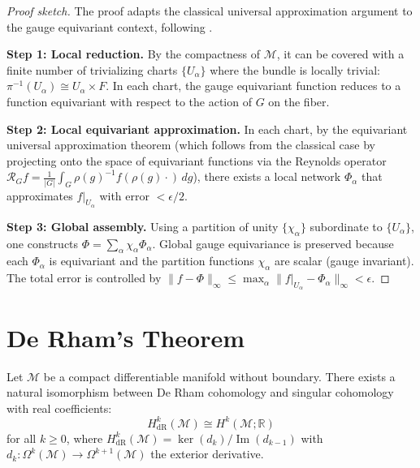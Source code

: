 \begin{proof}[Proof sketch]
The proof adapts the classical universal approximation argument to the gauge equivariant context, following \citep{cohen2019gaugeequivariantconvolutional}.

\textbf{Step 1: Local reduction.} By the compactness of $\mathcal{M}$, it can be covered with a finite number of trivializing charts $\{U_\alpha\}$ where the bundle is locally trivial: $\pi^{-1}(U_\alpha) \cong U_\alpha \times F$. In each chart, the gauge equivariant function reduces to a function equivariant with respect to the action of $G$ on the fiber.

\textbf{Step 2: Local equivariant approximation.} In each chart, by the equivariant universal approximation theorem (which follows from the classical case by projecting onto the space of equivariant functions via the Reynolds operator $\mathcal{R}_G f = \frac{1}{|G|}\int_G \rho(g)^{-1} f(\rho(g) \cdot) \, dg$), there exists a local network $\Phi_\alpha$ that approximates $f|_{U_\alpha}$ with error $< \epsilon/2$.

\textbf{Step 3: Global assembly.} Using a partition of unity $\{\chi_\alpha\}$ subordinate to $\{U_\alpha\}$, one constructs $\Phi = \sum_\alpha \chi_\alpha \Phi_\alpha$. Global gauge equivariance is preserved because each $\Phi_\alpha$ is equivariant and the partition functions $\chi_\alpha$ are scalar (gauge invariant). The total error is controlled by $\|f - \Phi\|_\infty \leq \max_\alpha \|f|_{U_\alpha} - \Phi_\alpha\|_\infty < \epsilon$.
\end{proof}

\section{De Rham's Theorem}\label{sec:de_rham}

\begin{theorem}[De Rham]\label{thm:de_rham_apendice}
Let $\mathcal{M}$ be a compact differentiable manifold without boundary. There exists a natural isomorphism between De Rham cohomology and singular cohomology with real coefficients:
\[
H^k_{\text{dR}}(\mathcal{M}) \cong H^k(\mathcal{M}; \mathbb{R})
\]
for all $k \geq 0$, where $H^k_{\text{dR}}(\mathcal{M}) = \ker(d_k)/\operatorname{Im}(d_{k-1})$ with $d_k: \Omega^k(\mathcal{M}) \to \Omega^{k+1}(\mathcal{M})$ the exterior derivative.
\end{theorem}

